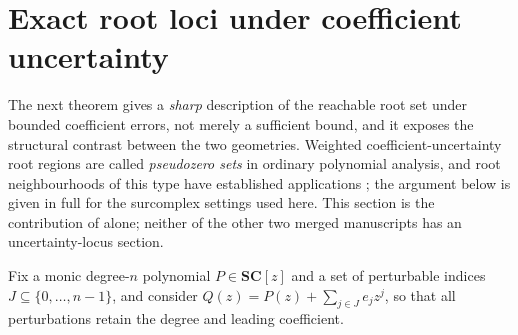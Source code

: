 \documentclass[11pt,letterpaper]{article}
\numberwithin{equation}{section}
\theoremstyle{definition}
\theoremstyle{remark}\newtheorem{remark}[theorem]{Remark}
\newcommand{\SC}{\mathbf{SC}}
\begin{document}
\section{Exact root loci under coefficient uncertainty}
\label{polynomial:sec:pseudozeros}
The next theorem gives a \emph{sharp} description of the reachable root set
under bounded coefficient errors, not merely a sufficient bound, and it
exposes the structural contrast between the two geometries. Weighted
coefficient-uncertainty root regions are called \emph{pseudozero sets} in
ordinary polynomial analysis, and root neighbourhoods of this type have
established applications \cite{polynomial:FaroukiHan}; the argument below is
given in full for the surcomplex settings used here. This section is the
contribution of \cite{polynomial:MsFactorization} alone; neither of the other
two merged manuscripts has an uncertainty-locus section.

Fix a monic degree-$n$ polynomial $P\in\SC[z]$ and a set of perturbable
indices $J\subseteq\{0,\ldots,n-1\}$, and consider $Q(z)=P(z)+\sum_{j\in
J}e_jz^j$, so that all perturbations retain the degree and leading
coefficient.
\end{document}
